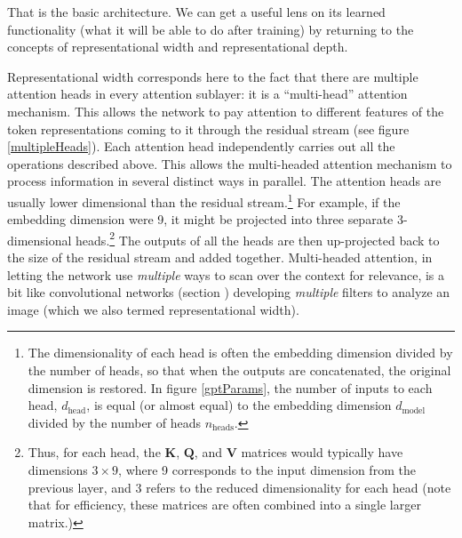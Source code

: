 That is the basic architecture. We can get a useful lens on its learned
functionality (what it will be able to do after training) by returning to the concepts of
representational width and representational depth.
 
Representational width corresponds here to the fact that
there are multiple attention heads in every attention sublayer: it is a
``multi-head'' attention mechanism. This allows the network to pay attention to
different features of the token representations coming to it through the
residual stream (see figure \ref{multipleHeads}). Each attention head independently
carries out all the operations described above. This allows the multi-headed attention mechanism to process
information in several distinct ways in parallel. The attention heads are usually lower dimensional than the residual stream.\footnote{The
dimensionality of each head is often the embedding dimension divided by the
number of heads, so that when the outputs are concatenated, the original
dimension is restored. In figure \ref{gptParams}, the number of inputs to each
head, $d_\text{head}$, is equal (or almost equal) to the embedding dimension
$d_\text{model}$ divided by the number of heads $n_\text{heads}$.}
 For example, if the embedding dimension were 9, it might be projected into three separate
3-dimensional heads.\footnote{Thus, for each head, the $\textbf{K}$,
$\textbf{Q}$, and $\textbf{V}$ matrices would typically have dimensions $3
\times 9$, where 9 corresponds to the input dimension from the previous layer,
and 3 refers to the reduced dimensionality for each head (note that for
efficiency, these matrices are often combined into a single larger matrix.)}
The outputs of all the heads are then up-projected back to the size of the
residual stream and added together. Multi-headed attention, in letting the
network use \emph{multiple} ways to scan over the context for relevance, is a
bit like convolutional networks (section )
developing \emph{multiple} filters to analyze an image (which we also termed
representational width).

